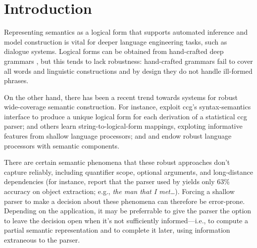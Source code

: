 \section{Introduction} \label{sec:intro}

Representing semantics as a logical form that supports automated
inference and model construction is vital for deeper language
engineering tasks, such as dialogue systems.  Logical forms
can be obtained from hand-crafted deep grammars
\cite{butt:etal:1999,copestake:flickinger:2000}, but this
tends to lack robustness: hand-crafted grammars fail to cover all
words and linguistic constructions and by design they do not handle
ill-formed phrases. 

On the other hand, there has been a recent trend towards systems for
robust wide-coverage semantic construction.  For instance,
 exploit {\sc ccg}'s syntax-semantics
interface to produce a unique logical form for each derivation of a
statistical {\sc ccg} parser;  and
others learn string-to-logical-form mappings, exploting informative
features from shallow language processors; and
 and  endow robust
language processors with semantic components.

% 

There are certain semantic phenomena that these robust
approaches don't capture reliably, including quantifier scope,
optional arguments, and long-distance dependencies (for instance,
 report that the parser used by
 yields only 63\% accuracy on object
extraction; e.g., {\em the man that I met\dots}).  Forcing a shallow
parser to make a decision about these phenomena can therefore be
error-prone.  Depending on the application, it may be preferrable to
give the parser the option to leave the decision open when it's not
sufficiently informed---i.e., to compute a partial semantic
representation and to complete it later, using information
extraneous to the parser.

